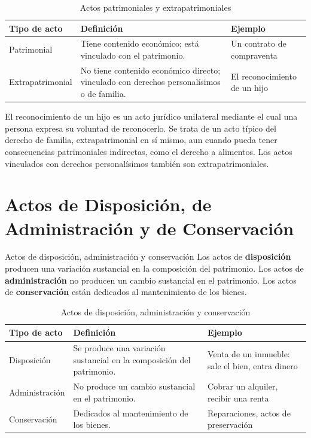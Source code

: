 \documentclass[12pt,oneside]{book}
\begin{document}
\begin{table}[H]
\centering
\begin{tabularx}{\textwidth}{l X X}
\toprule
\textbf{Tipo de acto} & \textbf{Definición} & \textbf{Ejemplo} \\
\midrule
Patrimonial & Tiene contenido económico; está vinculado con el patrimonio. & Un contrato de compraventa \\
Extrapatrimonial & No tiene contenido económico directo; vinculado con derechos personalísimos o de familia. & El reconocimiento de un hijo \\
\bottomrule
\end{tabularx}
\caption{Actos patrimoniales y extrapatrimoniales}
\end{table}

El reconocimiento de un hijo es un acto jurídico unilateral mediante el cual una persona expresa su voluntad de reconocerlo. Se trata de un acto típico del derecho de familia, extrapatrimonial en sí mismo, aun cuando pueda tener consecuencias patrimoniales indirectas, como el derecho a alimentos. Los actos vinculados con derechos personalísimos también son extrapatrimoniales.

\section{Actos de Disposición, de Administración y de Conservación}

\begin{definition}{Actos de disposición, administración y conservación}
Los actos de \textbf{disposición} producen una variación sustancial en la composición del patrimonio. Los actos de \textbf{administración} no producen un cambio sustancial en el patrimonio. Los actos de \textbf{conservación} están dedicados al mantenimiento de los bienes.
\end{definition}

\begin{table}[H]
\centering
\begin{tabularx}{\textwidth}{l X X}
\toprule
\textbf{Tipo de acto} & \textbf{Definición} & \textbf{Ejemplo} \\
\midrule
Disposición & Se produce una variación sustancial en la composición del patrimonio. & Venta de un inmueble: sale el bien, entra dinero \\
Administración & No produce un cambio sustancial en el patrimonio. & Cobrar un alquiler, recibir una renta \\
Conservación & Dedicados al mantenimiento de los bienes. & Reparaciones, actos de preservación \\
\bottomrule
\end{tabularx}
\caption{Actos de disposición, administración y conservación}
\end{table}
\end{document}

